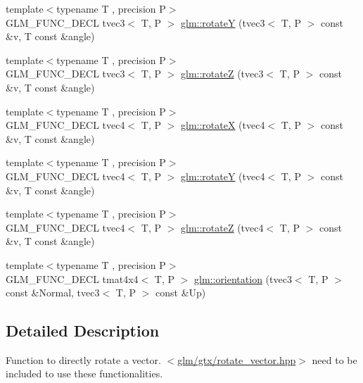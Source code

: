 \begin{DoxyCompactItemize}
\item 
{\footnotesize template$<$typename T , precision P$>$ }\\G\-L\-M\-\_\-\-F\-U\-N\-C\-\_\-\-D\-E\-C\-L tvec3$<$ T, P $>$ \hyperlink{group__gtx__rotate__vector_gabb5d19eba5befeebcb35a0aad4a114e3}{glm\-::rotate\-Y} (tvec3$<$ T, P $>$ const \&v, T const \&angle)
\item 
{\footnotesize template$<$typename T , precision P$>$ }\\G\-L\-M\-\_\-\-F\-U\-N\-C\-\_\-\-D\-E\-C\-L tvec3$<$ T, P $>$ \hyperlink{group__gtx__rotate__vector_gae30ac01b89d4f16a972fee696c964908}{glm\-::rotate\-Z} (tvec3$<$ T, P $>$ const \&v, T const \&angle)
\item 
{\footnotesize template$<$typename T , precision P$>$ }\\G\-L\-M\-\_\-\-F\-U\-N\-C\-\_\-\-D\-E\-C\-L tvec4$<$ T, P $>$ \hyperlink{group__gtx__rotate__vector_gadab312d430a564741ae02215255027a0}{glm\-::rotate\-X} (tvec4$<$ T, P $>$ const \&v, T const \&angle)
\item 
{\footnotesize template$<$typename T , precision P$>$ }\\G\-L\-M\-\_\-\-F\-U\-N\-C\-\_\-\-D\-E\-C\-L tvec4$<$ T, P $>$ \hyperlink{group__gtx__rotate__vector_gae2507577c4bffa3548b32852791dd90c}{glm\-::rotate\-Y} (tvec4$<$ T, P $>$ const \&v, T const \&angle)
\item 
{\footnotesize template$<$typename T , precision P$>$ }\\G\-L\-M\-\_\-\-F\-U\-N\-C\-\_\-\-D\-E\-C\-L tvec4$<$ T, P $>$ \hyperlink{group__gtx__rotate__vector_ga034e5d197ab4bd8685624bc2cf16e586}{glm\-::rotate\-Z} (tvec4$<$ T, P $>$ const \&v, T const \&angle)
\item 
{\footnotesize template$<$typename T , precision P$>$ }\\G\-L\-M\-\_\-\-F\-U\-N\-C\-\_\-\-D\-E\-C\-L tmat4x4$<$ T, P $>$ \hyperlink{group__gtx__rotate__vector_ga49b4d082305cdfcfe0a5c184f684a902}{glm\-::orientation} (tvec3$<$ T, P $>$ const \&Normal, tvec3$<$ T, P $>$ const \&Up)
\end{DoxyCompactItemize}


\subsection{Detailed Description}
Function to directly rotate a vector. $<$\hyperlink{rotate__vector_8hpp}{glm/gtx/rotate\-\_\-vector.\-hpp}$>$ need to be included to use these functionalities. 

